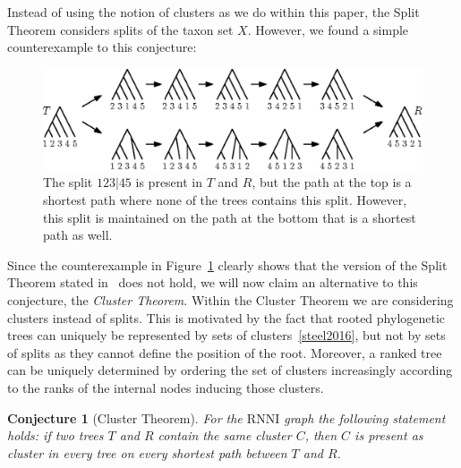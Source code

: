 \documentclass[11pt, a4paper]{article}
\newcommand{\rnni}{\mathrm{RNNI}}
\newtheorem{conjecture}[definition]{Conjecture}
\begin{document}
Instead of using the notion of clusters as we do within this paper, the Split Theorem considers splits of the taxon set $X$.
However, we found a simple counterexample to this conjecture:

\begin{figure}[H]
	\centering
	\includegraphics[width=\textwidth]{splitthm_counterexample}
	\caption{The split $123|45$ is present in $T$ and $R$, but the path at the top is a shortest path where none of the trees contains this split.
    However, this split is maintained on the path at the bottom that is a shortest path as well.}
	\label{splitthm_counterexample}
\end{figure}

Since the counterexample in Figure~\ref{splitthm_counterexample} clearly shows that the version of the Split Theorem stated in~\cite{Gavryushkin2017} does not hold, we will now claim an alternative to this conjecture, the \emph{Cluster Theorem}.
Within the Cluster Theorem we are considering clusters instead of splits.
This is motivated by the fact that rooted phylogenetic trees can uniquely be represented by sets of clusters~\ref{steel2016}, but not by sets of splits as they cannot define the position of the root.
Moreover, a ranked tree can be uniquely determined by ordering the set of clusters increasingly according to the ranks of the internal nodes inducing those clusters.

%
%

\begin{conjecture}[Cluster Theorem]
	For the $\rnni$ graph the following statement holds:
	if two trees $T$ and $R$ contain the same cluster $C$, then $C$ is present as cluster in every tree on every shortest path between $T$ and $R$.
	\label{cluster_theorem}
\end{conjecture}
\end{document}
